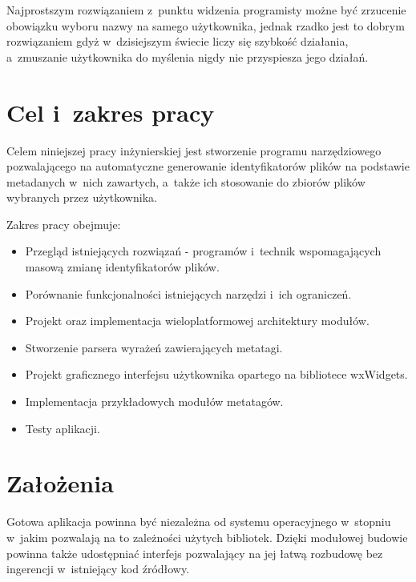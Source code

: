 Najprostszym rozwiązaniem z~punktu widzenia programisty możne być zrzucenie obowiązku wyboru nazwy na samego użytkownika, jednak rzadko jest to dobrym rozwiązaniem gdyż w~dzisiejszym świecie liczy się szybkość działania, a~zmuszanie użytkownika do myślenia nigdy nie przyspiesza jego działań.


\section{Cel i~zakres pracy}
\par
Celem niniejszej pracy inżynierskiej jest stworzenie programu narzędziowego pozwalającego na automatyczne generowanie identyfikatorów plików na podstawie metadanych w~nich zawartych, a~także ich stosowanie do zbiorów plików wybranych przez użytkownika.

\par
Zakres pracy obejmuje:
\begin{itemize}
\item Przegląd istniejących rozwiązań - programów i~technik wspomagających masową zmianę identyfikatorów plików.
\item Porównanie funkcjonalności istniejących narzędzi i~ich ograniczeń.
\item Projekt oraz implementacja wieloplatformowej architektury modułów.
\item Stworzenie parsera wyrażeń zawierających metatagi.
\item Projekt graficznego interfejsu użytkownika opartego na bibliotece wxWidgets.
\item Implementacja przykładowych modułów metatagów.
\item Testy aplikacji.
\end{itemize}

\section{Założenia}
\label{zalozenia}
Gotowa aplikacja powinna być niezależna od systemu operacyjnego w~stopniu w~jakim pozwalają na to zależności użytych bibliotek. Dzięki modułowej budowie powinna także udostępniać interfejs pozwalający na jej łatwą rozbudowę bez ingerencji w~istniejący kod źródłowy.

